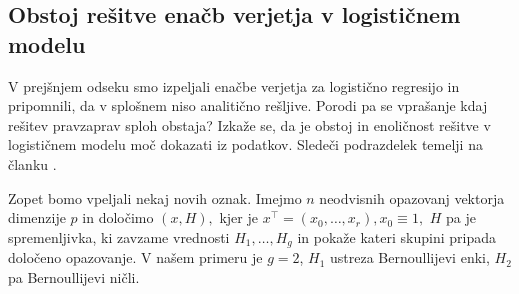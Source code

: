 \documentclass[12pt,a4paper]{amsart}
\theoremstyle{definition} %
\theoremstyle{plain} %
\begin{document}
\subsection{Obstoj rešitve enačb verjetja v logističnem modelu}

V prejšnjem odseku smo izpeljali enačbe verjetja za logistično regresijo in pripomnili, da v splošnem niso analitično rešljive. Porodi pa se vprašanje
kdaj rešitev pravzaprav sploh obstaja? Izkaže se, da je obstoj in enoličnost rešitve v logističnem modelu moč dokazati iz podatkov. Sledeči podrazdelek temelji na članku
\cite{albert1984existence}.

Zopet bomo vpeljali nekaj novih oznak. Imejmo $n$ neodvisnih opazovanj vektorja dimenzije $p$ in določimo $(x,H),$ kjer je $x^\top = (x_{0},\ldots,x_{r}),x_{0}\equiv 1,$
$H$ pa je spremenljivka, ki zavzame vrednosti $H_{1},\ldots,H_{g}$ in pokaže kateri skupini pripada določeno opazovanje. V našem primeru je $g=2$, $H_{1}$ ustreza Bernoullijevi
enki, $H_{2}$ pa Bernoullijevi ničli.

\end{document}
